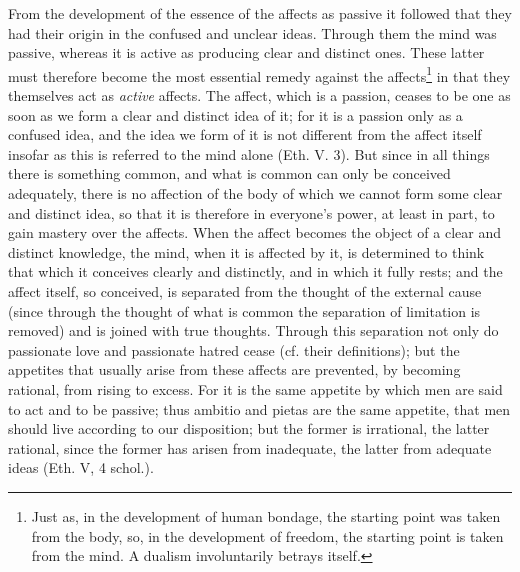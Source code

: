 \documentclass[12pt,a4paper,openany]{book}
\newcommand{\opage}[1]{\marginnote{\footnotesize\textit{[#1]}}}
\begin{document}
From the development of the essence of the affects as passive it followed
that they had their origin in the confused and unclear
ideas. Through them the mind was passive, whereas it is
\opage{163}\setcounter{footnote}{0}active as producing clear and distinct ones. These latter
must therefore become the most essential remedy against the affects\footnote{Just as, in the development of human bondage, the starting point
was taken from the body, so, in the development of freedom, the starting point is taken
from the mind. A dualism involuntarily betrays itself.}
in that they themselves act as \emph{active} affects. The affect, which is
a passion, ceases to be one as soon as we form a
clear and distinct idea of it; for it is a passion only as a
confused idea, and the idea we form of it is not
different from the affect itself insofar as this is referred to
the mind alone (Eth. V. 3). But since in all things there is something
common, and what is common can only be conceived adequately, there is
no affection of the body of which we cannot
form some clear and distinct idea, so that
it is therefore in everyone's power, at least in part, to gain
mastery over the affects. When the affect becomes the object
of a clear and distinct knowledge, the mind,
when it is affected by it, is determined to think that which
it conceives clearly and distinctly, and in which it fully
rests; and the affect itself, so conceived, is separated from
the thought of the external cause (since through the thought of what is
common the separation of limitation is removed) and is joined
with true thoughts. Through this separation not
only do passionate love and passionate
hatred cease (cf. their definitions); but the appetites that usually
arise from these affects are prevented, by becoming rational,
from rising to excess. For it is the same
appetite by which men are said to act and to be passive;
thus ambitio and pietas are the same appetite, that
men should live according to our disposition; but the former is irrational,
the latter rational, since the former has arisen from inadequate,
the latter from adequate ideas (Eth. V, 4 schol.).
\end{document}
